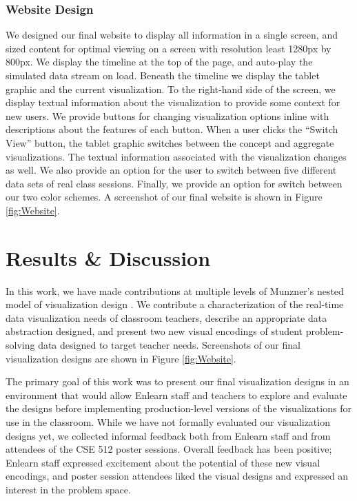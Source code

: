\documentclass{sigchi}
\begin{document}
\subsubsection{Website Design}
We designed our final website to display all information in a single screen, and sized content for optimal viewing on a screen with resolution least 1280px by 800px. We display the timeline at the top of the page, and auto-play the simulated data stream on load. Beneath the timeline we display the tablet graphic and the current visualization. To the right-hand side of the screen, we display textual information about the visualization to provide some context for new users. We provide buttons for changing visualization options inline with descriptions about the features of each button. When a user clicks the ``Switch View'' button, the tablet graphic switches between the concept and aggregate visualizations. The textual information associated with the visualization changes as well. We also provide an option for the user to switch between five different data sets of real class sessions. Finally, we provide an option for switch between our two color schemes.  A screenshot of our final website is shown in Figure \ref{fig:Website}. 

\section{Results \& Discussion}

In this work, we have made contributions at multiple levels of Munzner's nested model of visualization design \cite{Munzner09}. We contribute a characterization of the real-time data visualization needs of classroom teachers, describe an appropriate data abstraction designed, and present two new visual encodings of student problem-solving data designed to target teacher needs. Screenshots of our final visualization designs are shown in Figure \ref{fig:Website}.

The primary goal of this work was to present our final visualization designs in an environment that would allow Enlearn staff and teachers to explore and evaluate the designs before implementing production-level versions of the visualizations for use in the classroom. While we have not formally evaluated our visualization designs yet, we collected informal feedback both from Enlearn staff and from attendees of the CSE 512 poster sessions. Overall feedback has been positive; Enlearn staff expressed excitement about the potential of these new visual encodings, and poster session attendees liked the visual designs and expressed an interest in the problem space.
\end{document}
